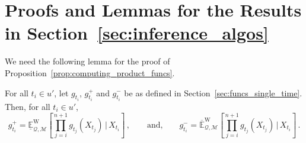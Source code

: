 \documentclass[twoside,11pt]{article}
\newcommand{\lexp}{\underline{\mathbb{E}}_{\rateset,\mathcal{M}}^\mathrm{W}}
\newcommand{\uexp}{\overline{\mathbb{E}}_{\rateset,\mathcal{M}}^\mathrm{W}}
\newcommand{\rateset}{\mathcal{Q}}
\begin{document}
\section{Proofs and Lemmas for the Results in Section~\ref{sec:inference_algos}}

We need the following lemma for the proof of Proposition~\ref{prop:computing_product_funcs}.
\begin{lemma}\label{lemma:product_func_induction}
For all $t_i\in u'$, let $g_{t_i}$, $g_{t_i}^+$ and $g_{t_i}^-$ be as defined in Section~\ref{sec:funcs_single_time}. Then, for all $t_i\in u'$,
\begin{equation*}
g_{t_i}^+ = \lexp\left[\prod_{j=i}^{n+1}g_{t_j}(X_{t_j})\,\vert\,X_{t_i}\right]\,, \quad\quad\text{and,} \quad\quad g_{t_i}^- = \uexp\left[\prod_{j=i}^{n+1}g_{t_j}(X_{t_j})\,\vert\,X_{t_i}\right]\,.
\end{equation*}
\end{lemma}
\end{document}
